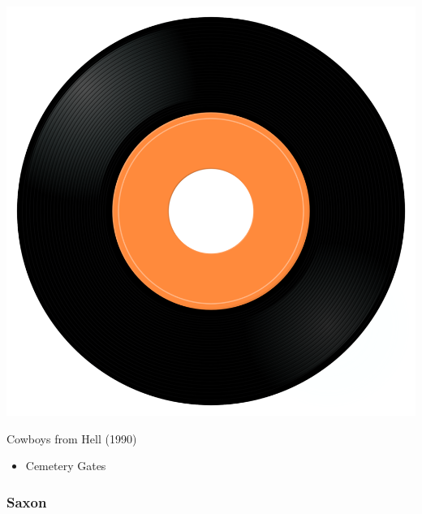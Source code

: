 \begin{minipage}[t]{0.25\textwidth}
\captionsetup{type=figure}
\includegraphics[width=\textwidth]{Images/cover.png}
\caption*{Cowboys from Hell (1990)}
\end{minipage}
\begin{minipage}[t]{0.25\textwidth}\vspace{0pt}
\begin{itemize}[nosep,leftmargin=1em,labelwidth=*,align=left]
	\setlength{\itemsep}{0pt}
	\item Cemetery Gates
\end{itemize}
\end{minipage}

\subsubsection{Saxon}

